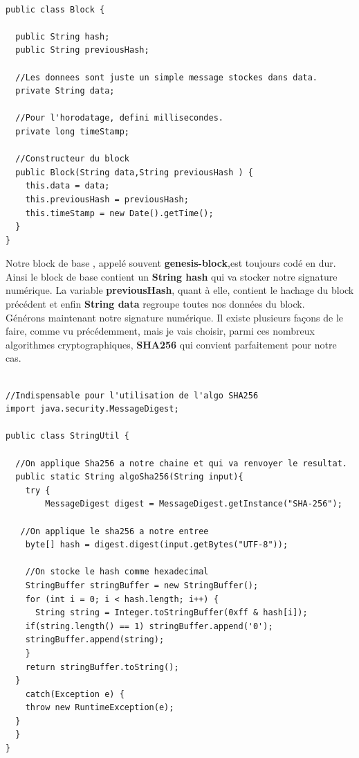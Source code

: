 \documentclass[12pt]{report}
\begin{document}
\begin{lstlisting}

public class Block {

  public String hash;
  public String previousHash;
  
  //Les donnees sont juste un simple message stockes dans data.
  private String data; 
  
  //Pour l'horodatage, defini millisecondes.
  private long timeStamp;

  //Constructeur du block
  public Block(String data,String previousHash ) {
    this.data = data;
    this.previousHash = previousHash;
    this.timeStamp = new Date().getTime();
  }
}

\end{lstlisting}

Notre block de base , appelé souvent \textbf{genesis-block},est toujours codé en dur. Ainsi le block de base  contient un \textbf{String hash} qui va stocker notre signature numérique. La variable \textbf{previousHash}, quant à elle, contient le hachage du block précédent et enfin \textbf{String data} regroupe toutes nos données du block.\\

Générons maintenant notre signature numérique. Il existe plusieurs façons de le faire, comme vu précédemment, mais je vais choisir, parmi ces nombreux algorithmes cryptographiques, \textbf{SHA256} qui convient parfaitement pour notre cas.

\begin{lstlisting}

//Indispensable pour l'utilisation de l'algo SHA256
import java.security.MessageDigest;

public class StringUtil {

  //On applique Sha256 a notre chaine et qui va renvoyer le resultat.
  public static String algoSha256(String input){    
    try {
        MessageDigest digest = MessageDigest.getInstance("SHA-256");
      
   //On applique le sha256 a notre entree 
    byte[] hash = digest.digest(input.getBytes("UTF-8"));   
    
    //On stocke le hash comme hexadecimal
    StringBuffer stringBuffer = new StringBuffer(); 
    for (int i = 0; i < hash.length; i++) {
      String string = Integer.toStringBuffer(0xff & hash[i]);
    if(string.length() == 1) stringBuffer.append('0');
    stringBuffer.append(string);
    }
    return stringBuffer.toString();
  }
    catch(Exception e) {
    throw new RuntimeException(e);
  }
  } 
}
\end{lstlisting}
\end{document}
